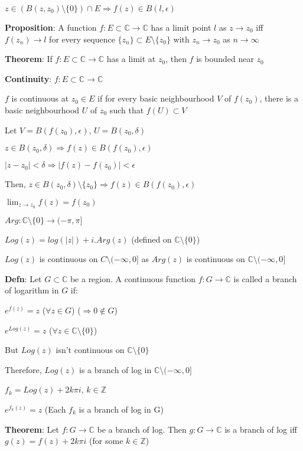 \documentclass{article}
\begin{document}
\begin{flushleft}
$z \in (B(z,z_0)\setminus\{0\})\cap E \Rightarrow f(z)\in B(l,\epsilon)$ 

\textbf{Proposition}: A function $f:E\subset  \mathds{C}\rightarrow \mathds{C}$ has a limit point $l$ as $z\rightarrow z_0$ iff $f(z_n)\rightarrow l$ for every sequence $\{z_n\}\subset E\setminus \{z_0\}$ with $z_n\rightarrow z_0$ as $n\rightarrow \infty$

\textbf{Theorem}: If $f:E\subset \mathds{C} \rightarrow \mathds{C}$ has a limit at $z_0$, then $f$ is bounded near $z_0$

\textbf{Continuity}: $f:E\subset \mathds{C}\rightarrow \mathds{C}$

$f$ is continuous at $z_0\in E$ if for every basic neighbourhood $V$ of $f(z_0)$, there is a basic neighbourhood $U$ of $z_0$ such that $f(U)\subset V$

Let $V=B(f(z_0),\epsilon)$, $U=B(z_0,\delta)$

$z\in B(z_0,\delta)\Rightarrow f(z)\in B(f(z_0),\epsilon)$

$|z-z_0|<\delta \Rightarrow |f(z)-f(z_0)|<\epsilon$

Then, $z\in B(z_0,\delta)\setminus \{z_0\} \Rightarrow f(z)\in B(f(z_0),\epsilon)$

$\lim_{z \to z_0} f(z)=f(z_0)$

$Arg: \mathds{C}\setminus \{0\} \rightarrow (-\pi,\pi]$

$Log(z)=log(|z|)+i.Arg(z)$ (defined on $\mathds{C}\setminus \{0\}$)

$Log(z)$ is continuous on $C\setminus (-\infty,0]$ as $Arg(z)$ is continuous on $\mathds{C}\setminus (-\infty,0]$

\textbf{Defn}: Let $G\subset \mathds{C}$ be a region. A continuous function $f:G\rightarrow \mathds{C}$ is called a branch of logarithm in $G$ if:

$e^{f(z)}=z$ ($\forall z\in G$) ($\Rightarrow 0\notin G$)

$e^{Log(z)}=z$ ($\forall z\in \mathds{C}\setminus \{0\}$)

But $Log(z)$ isn't continuous on $\mathds{C}\setminus\{0\}$

Therefore, $Log(z)$ is a branch of log in $\mathds{C}\setminus (-\infty,0]$ 

$f_k=Log(z)+2k\pi i$, $k\in \mathds{Z}$

$e^{f_k(z)}=z$ (Each $f_k$ is a branch of log in G)

\textbf{Theorem}: Let $f:G\rightarrow \mathds{C}$ be a branch of log. Then $g:G\rightarrow \mathds{C}$ is a branch of log iff $g(z)=f(z)+2k\pi i$ (for some $k\in \mathds{Z}$)


\end{flushleft}
\end{document}
